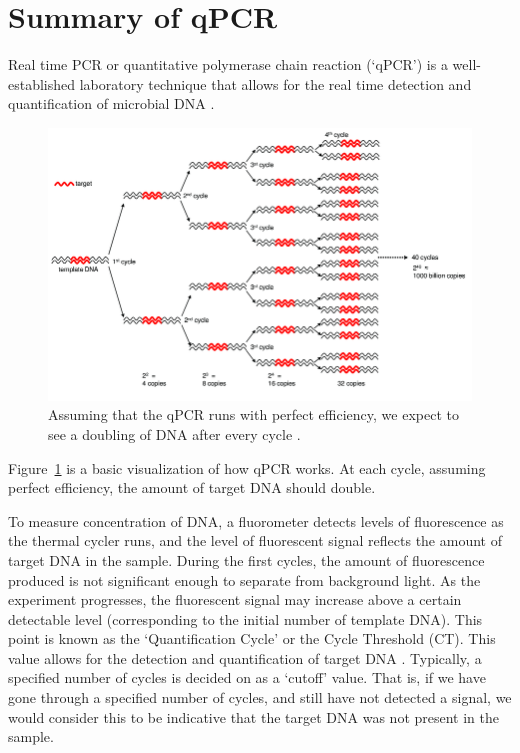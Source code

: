 \label{chapter:problem}


\newlength{\savedunitlength}
\setlength{\unitlength}{2em}


\section{Summary of qPCR}

Real time PCR or quantitative polymerase chain reaction (`qPCR') is a well-established laboratory technique that allows for the real time detection and quantification of microbial DNA \citep{introqpcr}.



\begin{figure}[H]
\includegraphics[scale=0.5]{Chapter2Images/amp.png}
\caption{Assuming that the qPCR runs with perfect efficiency, we expect to see a doubling of DNA after every cycle \citep{foodscience}.}
\label{fig:amp}
\end{figure} 

\newpage



Figure~\ref{fig:amp} is a basic visualization of how qPCR works. At each cycle, assuming perfect efficiency, the amount of target DNA should double.

\vspace{5mm}

To measure concentration of DNA, a fluorometer detects levels of fluorescence as the thermal cycler runs, and the level of fluorescent signal reflects the amount of target DNA in the sample. During the first cycles, the amount of fluorescence produced is not significant enough to separate from background light. As the experiment progresses, the fluorescent signal may increase above a certain detectable level (corresponding to the initial number of template DNA). This point is known as the `Quantification Cycle' or the Cycle Threshold (CT). This value allows for the detection and quantification of target DNA \citep{ctmethod}. Typically, a specified number of cycles is decided on as a `cutoff' value. That is, if we have gone through a specified number of cycles, and still have not detected a signal, we would consider this to be indicative that the target DNA was not present in the sample.









